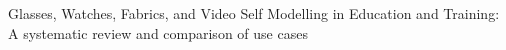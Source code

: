 Glasses, Watches, Fabrics, and Video Self Modelling in Education and Training: A systematic review and comparison of use cases